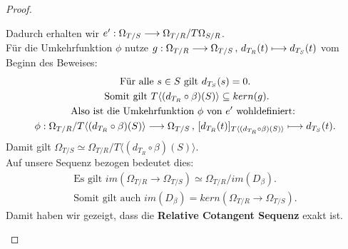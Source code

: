 \documentclass[10pt,a4paper]{report}
\newcommand{\functionfront}[3]{\nolinebreak{#1:#2 \longrightarrow #3}}
\newcommand{\function}[5]{\nolinebreak{#1:#2 \longrightarrow #3 \, , \, #4 \longmapsto #5}}
\newcommand{\divR}[2]{\Omega_{#1/#2}}
\newcommand{\divf}[1]{d_{#1}}
\newcommand{\kernel}[1]{kern(#1)}
\newcommand{\immage}[1]{im(#1)}
\begin{document}
\begin{proof}
\begin{itemize}
\begin{center}
\end{center}
Dadurch erhalten wir $\functionfront{e'}{\divR{T}{S}}{\divR{T}{R}/T \divR{S}{R}}$.\\
Für die Umkehrfunktion $\phi$ nutze $\function{g}{\divR{T}{R}}{\divR{T}{S}}{\divf{T_R}(t)}{\divf{T_S}(t)}$ vom Beginn des Beweises:
\begin{gather*}
\text{Für alle } s \in S \text{ gilt } \divf{T_S}(s) = 0.\\
\text{ Somit gilt } T \langle (\divf{T_R} \circ \beta)(S) \rangle \subseteq \kernel{g}.\\
\text{Also ist die Umkehrfunktion $\phi$ von $e'$ wohldefiniert: }\\
 \function{\phi}{\divR{T}{R}/T \langle (\divf{T_R} \circ \beta)(S) \rangle}{\divR{T}{S}}{[\divf{T_R}(t)]_{T \langle (\divf{T_R} \circ \beta)(S) \rangle}}{\divf{T_S}(t)}.
\end{gather*}
Damit gilt $\divR{T}{S} \simeq \divR{T}{R}/T \langle (\divf{T_R} \circ \beta)(S) \rangle$.\\
Auf unsere Sequenz bezogen bedeutet dies:
\begin{gather*}
\text{Es gilt } \immage{\divR{T}{R} \rightarrow \divR{T}{S}} \simeq \divR{T}{R} / \immage{D_{\beta}}.\\
\text{Somit gilt auch } \immage{D_{\beta}} = \kernel{ \divR{T}{R} \rightarrow \divR{T}{S} }. 
\end{gather*}
Damit haben wir gezeigt, dass die \textbf{Relative Cotangent Sequenz} exakt ist.
\end{itemize}
\end{proof}
\end{document}
